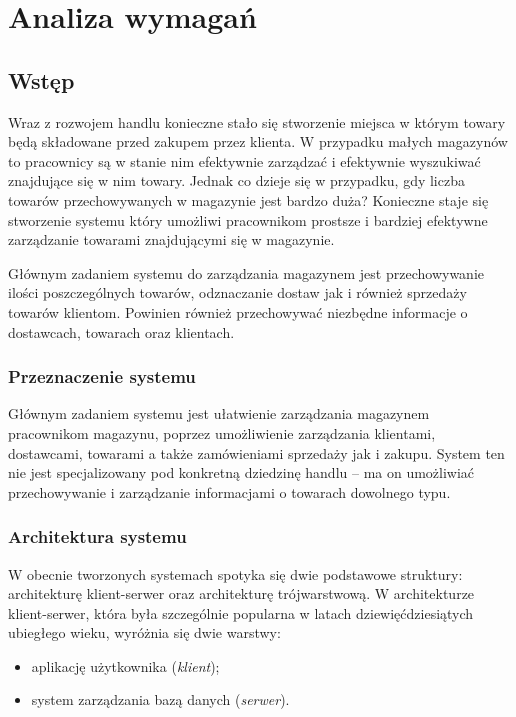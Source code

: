 \chapter{Analiza wymagań}

\section{Wstęp}


Wraz z rozwojem handlu konieczne stało się stworzenie miejsca w którym towary
będą składowane przed zakupem przez klienta. W przypadku małych magazynów to
pracownicy są w stanie nim efektywnie zarządzać i efektywnie wyszukiwać 
znajdujące się w nim towary. Jednak co dzieje się w przypadku, gdy liczba towarów
przechowywanych w magazynie jest bardzo duża? Konieczne staje się stworzenie
systemu który umożliwi pracownikom prostsze i bardziej efektywne zarządzanie
towarami znajdującymi się w magazynie.

Głównym zadaniem systemu do zarządzania magazynem jest przechowywanie ilości
poszczególnych towarów, odznaczanie dostaw jak i również sprzedaży
towarów klientom. Powinien również przechowywać niezbędne informacje o
dostawcach, towarach oraz klientach.

\subsection{Przeznaczenie systemu}

Głównym zadaniem systemu jest ułatwienie zarządzania magazynem pracownikom
magazynu, poprzez umożliwienie zarządzania klientami, dostawcami, towarami a
także zamówieniami sprzedaży jak i zakupu. System ten nie jest specjalizowany
pod konkretną dziedzinę handlu -- ma on umożliwiać przechowywanie i
zarządzanie informacjami o towarach dowolnego typu. 

\subsection{Architektura systemu}

W obecnie tworzonych systemach spotyka się dwie podstawowe struktury:
architekturę klient-serwer oraz architekturę trójwarstwową.
W architekturze klient-serwer, która była szczególnie popularna w
latach dziewięćdziesiątych ubiegłego wieku, wyróżnia się
dwie warstwy: 
\begin{itemize}
 \item aplikację użytkownika (\emph{klient});
 \item system zarządzania bazą danych (\emph{serwer}).
\end{itemize}

